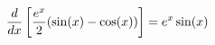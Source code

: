 \documentclass[preview]{standalone}
\begin{document}
\begin{align*}
\special{dvisvgm:raw <g id='unique000'>}\frac{d}{dx} \left[ \frac{e^x}{2} (\sin(x) - \cos(x)) \right] = e^x \sin(x)\special{dvisvgm:raw </g>}
\end{align*}
\end{document}
